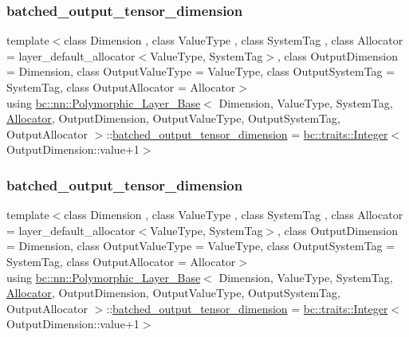 \subsubsection{\texorpdfstring{batched\+\_\+output\+\_\+tensor\+\_\+dimension}{batched\_output\_tensor\_dimension}\hspace{0.1cm}{\footnotesize\ttfamily [1/2]}}
{\footnotesize\ttfamily template$<$class Dimension , class Value\+Type , class System\+Tag , class Allocator  = layer\+\_\+default\+\_\+allocator$<$\+Value\+Type, System\+Tag$>$, class Output\+Dimension  = Dimension, class Output\+Value\+Type  = Value\+Type, class Output\+System\+Tag  = System\+Tag, class Output\+Allocator  = Allocator$>$ \\
using \hyperlink{structbc_1_1nn_1_1Polymorphic__Layer__Base}{bc\+::nn\+::\+Polymorphic\+\_\+\+Layer\+\_\+\+Base}$<$ Dimension, Value\+Type, System\+Tag, \hyperlink{classbc_1_1allocators_1_1Allocator}{Allocator}, Output\+Dimension, Output\+Value\+Type, Output\+System\+Tag, Output\+Allocator $>$\+::\hyperlink{structbc_1_1nn_1_1Polymorphic__Layer__Base_a012247fd372f38d7156bda51bdd74a70}{batched\+\_\+output\+\_\+tensor\+\_\+dimension} =  \hyperlink{structbc_1_1traits_1_1Integer}{bc\+::traits\+::\+Integer}$<$Output\+Dimension\+::value+1$>$}

\mbox{\label{structbc_1_1nn_1_1Polymorphic__Layer__Base_a012247fd372f38d7156bda51bdd74a70}} 
\subsubsection{\texorpdfstring{batched\+\_\+output\+\_\+tensor\+\_\+dimension}{batched\_output\_tensor\_dimension}\hspace{0.1cm}{\footnotesize\ttfamily [2/2]}}
{\footnotesize\ttfamily template$<$class Dimension , class Value\+Type , class System\+Tag , class Allocator  = layer\+\_\+default\+\_\+allocator$<$\+Value\+Type, System\+Tag$>$, class Output\+Dimension  = Dimension, class Output\+Value\+Type  = Value\+Type, class Output\+System\+Tag  = System\+Tag, class Output\+Allocator  = Allocator$>$ \\
using \hyperlink{structbc_1_1nn_1_1Polymorphic__Layer__Base}{bc\+::nn\+::\+Polymorphic\+\_\+\+Layer\+\_\+\+Base}$<$ Dimension, Value\+Type, System\+Tag, \hyperlink{classbc_1_1allocators_1_1Allocator}{Allocator}, Output\+Dimension, Output\+Value\+Type, Output\+System\+Tag, Output\+Allocator $>$\+::\hyperlink{structbc_1_1nn_1_1Polymorphic__Layer__Base_a012247fd372f38d7156bda51bdd74a70}{batched\+\_\+output\+\_\+tensor\+\_\+dimension} =  \hyperlink{structbc_1_1traits_1_1Integer}{bc\+::traits\+::\+Integer}$<$Output\+Dimension\+::value+1$>$}


